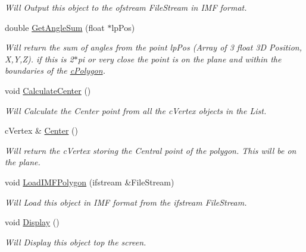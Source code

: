 \begin{DoxyCompactItemize}
\begin{DoxyCompactList}\small\item\em Will Output this object to the ofstream FileStream in IMF format. \end{DoxyCompactList}\item 
\hypertarget{classc_polygon_aa0ca7310cd7a5e4928545b0f4848dc76}{
double \hyperlink{classc_polygon_aa0ca7310cd7a5e4928545b0f4848dc76}{GetAngleSum} (float $\ast$lpPos)}
\label{classc_polygon_aa0ca7310cd7a5e4928545b0f4848dc76}

\begin{DoxyCompactList}\small\item\em Will return the sum of angles from the point lpPos (Array of 3 float 3D Position, X,Y,Z). if this is 2$\ast$pi or very close the point is on the plane and within the boundaries of the \hyperlink{classc_polygon}{cPolygon}. \end{DoxyCompactList}\item 
\hypertarget{classc_polygon_a68b5ed2b38f57344d31dcbd0fe99d8c7}{
void \hyperlink{classc_polygon_a68b5ed2b38f57344d31dcbd0fe99d8c7}{CalculateCenter} ()}
\label{classc_polygon_a68b5ed2b38f57344d31dcbd0fe99d8c7}

\begin{DoxyCompactList}\small\item\em Will Calculate the Center point from all the cVertex objects in the List. \end{DoxyCompactList}\item 
\hypertarget{classc_polygon_abda6161b06104bc44e10c91e9e7d5e84}{
cVertex \& \hyperlink{classc_polygon_abda6161b06104bc44e10c91e9e7d5e84}{Center} ()}
\label{classc_polygon_abda6161b06104bc44e10c91e9e7d5e84}

\begin{DoxyCompactList}\small\item\em Will return the cVertex storing the Central point of the polygon. This will be on the plane. \end{DoxyCompactList}\item 
\hypertarget{classc_polygon_aae45292be740b2b71214b40f1254b591}{
void \hyperlink{classc_polygon_aae45292be740b2b71214b40f1254b591}{LoadIMFPolygon} (ifstream \&FileStream)}
\label{classc_polygon_aae45292be740b2b71214b40f1254b591}

\begin{DoxyCompactList}\small\item\em Will Load this object in IMF format from the ifstream FileStream. \end{DoxyCompactList}\item 
\hypertarget{classc_polygon_ac846df7e8241cb4ea008996363345b0e}{
void \hyperlink{classc_polygon_ac846df7e8241cb4ea008996363345b0e}{Display} ()}
\label{classc_polygon_ac846df7e8241cb4ea008996363345b0e}

\begin{DoxyCompactList}\small\item\em Will Display this object top the screen. \end{DoxyCompactList}\end{DoxyCompactItemize}


